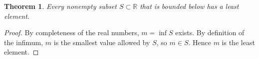 \documentclass{article}
\newtheorem{theorem}{Theorem}
\begin{document}
\begin{theorem}\label{thm:infimum-minimum}
Every nonempty subset $S\subset\mathbb R$ that is bounded below has a least
element.
\end{theorem}
\begin{proof}
By completeness of the real numbers, $m=\inf S$ exists. By definition of
the infimum, $m$ is the smallest value allowed by $S$, so $m\in S$. Hence
$m$ is the least element.
\end{proof}
\end{document}

